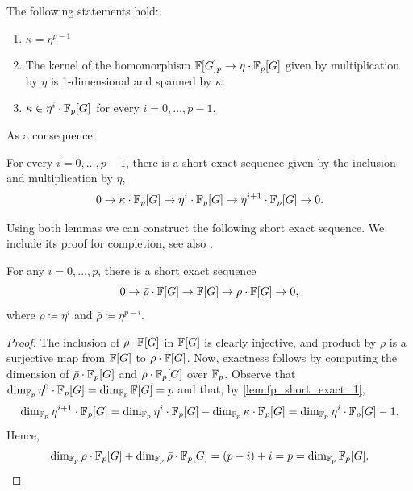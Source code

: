 \documentclass[a4paper,12pt]{amsart}
\begin{document}
\begin{lemma}
The following statements hold:
\begin{enumerate}[label=(\roman*)]
    \item $\kappa = \eta^{p-1}$
    \item The kernel of the homomorphism $\mathbb{F}[G]_p\rightarrow \eta\cdot\mathbb{F}_p[G]$ given by multiplication by $\eta$ is 1-dimensional and spanned by $\kappa$.
    \item $\kappa \in \eta^i\cdot\mathbb{F}_p[G]$ for every $i = 0,\ldots, p-1$.
\end{enumerate}
\end{lemma}

As a consequence:

\begin{lemma}\label{lem:fp_short_exact_1}
    For every $i=0,\ldots,p-1$, there is a short exact sequence given by the inclusion and multiplication by $\eta$,
    \[0\rightarrow \kappa \cdot \mathbb{F}_p[G] \rightarrow \eta^i \cdot \mathbb{F}_p[G]  \rightarrow \eta^{i+1} \cdot \mathbb{F}_p[G]  \rightarrow 0. \]
\end{lemma}

Using both lemmas we can construct the following short exact sequence. We include its proof for completion, see also \cite[Lemmas 4.5 and 4.6]{PutmanSTnotes}.

\begin{lemma}\label{lem:fp_short_exact_2}
    For any $i=0,\ldots,p$, there is a short exact sequence 
    $$0\rightarrow \bar\rho \cdot \mathbb{F}[G] \rightarrow  \mathbb{F}[G]  \rightarrow \rho \cdot \mathbb{F}[G]  \rightarrow 0,$$
    where $\rho \coloneqq \eta^i$ and $\bar\rho \coloneqq \eta^{p-i}$.
\end{lemma}
\begin{proof}
    The inclusion of $\bar\rho \cdot \mathbb{F}[G]$ in $\mathbb{F}[G]$ is clearly injective, and product by $\rho$ is a surjective map from $\mathbb{F}[G]$ to $\rho\cdot\mathbb{F}[G]$.
    Now, exactness follows by computing the dimension of $\bar\rho \cdot \mathbb{F}_p[G]$ and $\rho \cdot \mathbb{F}_p[G]$ over $\mathbb{F}_p$. Observe that $\operatorname{dim}_{\mathbb{F}_p} \eta^0\cdot\mathbb{F}_p[G] =\operatorname{dim}_{\mathbb{F}_p} \mathbb{F}[G] = p$ and that, by \cref{lem:fp_short_exact_1},
    $$\operatorname{dim}_{\mathbb{F}_p} \eta^{i+1} \cdot \mathbb{F}_p[G] = \operatorname{dim}_{\mathbb{F}_p} \eta^i\cdot\mathbb{F}_p[G] - \operatorname{dim}_{\mathbb{F}_p}\kappa\cdot\mathbb{F}_p[G] = \operatorname{dim}_{\mathbb{F}_p}\eta^i\cdot\mathbb{F}_p[G] - 1.$$
    Hence, $$\operatorname{dim}_{\mathbb{F}_p}\rho \cdot \mathbb{F}_p[G] + \operatorname{dim}_{\mathbb{F}_p}\bar\rho \cdot \mathbb{F}_p[G] = (p-i)+i = p = \operatorname{dim}_{\mathbb{F}_p}\mathbb{F}_p[G].\qedhere$$
\end{proof}
\end{document}

